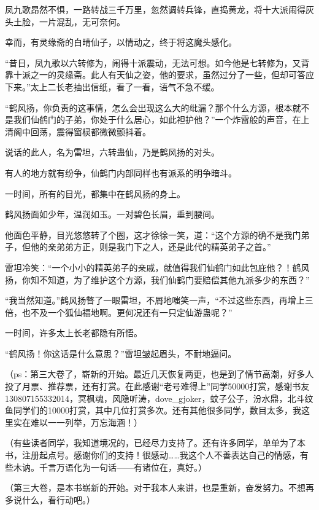 \begin{this_body}
凤九歌昂然不惧，一路转战三千万里，忽然调转兵锋，直捣黄龙，将十大派闹得灰头土脸，一片混乱，无可奈何。

幸而，有灵缘斋的白晴仙子，以情动之，终于将这魔头感化。

“昔日，凤九歌以六转修为，闹得十派震动，无法可想。如今他是七转修为，又背靠十派之一的灵缘斋。此人有天仙之姿，他的要求，虽然过分了一些，但却可答应下来。”太上二长老抽出信纸，看了一看，语气不急不缓。

“鹤风扬，你负责的这事情，怎么会出现这么大的纰漏？那个什么方源，根本就不是我们仙鹤门的子弟，你处于什么居心，如此袒护他？”一个炸雷般的声音，在上清阁中回荡，震得窗棂都微微颤抖着。

说话的此人，名为雷坦，六转蛊仙，乃是鹤风扬的对头。

有人的地方就有纷争，仙鹤门内部同样也有派系的明争暗斗。

一时间，所有的目光，都集中在鹤风扬的身上。

鹤风扬面如少年，温润如玉。一对碧色长眉，垂到腰间。

他面色平静，目光悠悠转了个圈，这才徐徐一笑，道：“这个方源的确不是我门弟子，但他的亲弟弟方正，则是我门下之人，还是此代的精英弟子之首。”

雷坦冷笑：“一个小小的精英弟子的亲戚，就值得我们仙鹤门如此包庇他？！鹤风扬，你知不知道，为了维护这个方源，我们仙鹤门要赔偿其他九派多少的东西？”

“我当然知道。”鹤风扬瞥了一眼雷坦，不屑地嗤笑一声，“不过这些东西，再增上三倍，也不及一个狐仙福地啊。更何况还有一只定仙游蛊呢？”

一时间，许多太上长老都隐有所悟。

“鹤风扬！你这话是什么意思？”雷坦皱起眉头，不耐地逼问。

（ps：第三大卷了，崭新的开始。最近几天恢复两更，也是到了情节高潮，好多人投了月票、推荐票，还有打赏。在此感谢“老号难得上”同学50000打赏，感谢书友130807155332014，冥枫魂，风隐听涛，dove\_gjoker，蚊子公子，汾水鼎，北斗纹鱼同学们的10000打赏，其中几位打赏多次。还有其他很多同学，数目太多，我这里实在难以一一列举，万忘海涵！）

（有些读者同学，我知道境况的，已经尽力支持了。还有许多同学，单单为了本书，注册起点号。感谢你们的支持！很感动……我这个人不善表达自己的情感，有些木讷。千言万语化为一句话——有诸位在，真好。）

（第三大卷，是本书崭新的开始。对于我本人来讲，也是重新，奋发努力。不想再多说什么，看行动吧。）

\end{this_body}

